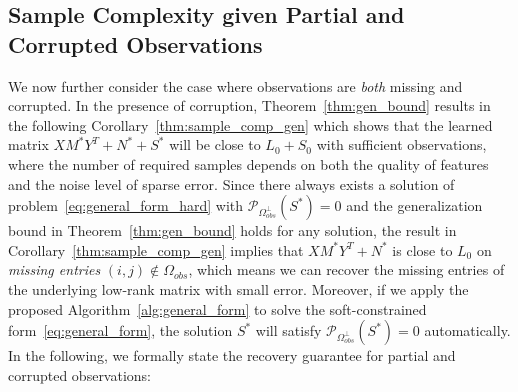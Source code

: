 \documentclass[twoside,11pt]{article}
\def\Obs{\Omega_{obs}}
\newcommand\proj[1]{{\mathcal P}_{#1}}
\def\realL{L_0}
\def\realS{S_0}
\def\optM{M^*}
\def\optN{N^*}
\def\optS{S^*}
\begin{document}
\subsection{Sample Complexity given Partial and Corrupted Observations}
\label{subsec:theory.gen}
We now further consider the case where observations are {\it both} missing and corrupted.
In the presence of corruption,
Theorem~\ref{thm:gen_bound} results in the following Corollary~\ref{thm:sample_comp_gen} which
shows that the learned matrix $X\optM Y^T + \optN + \optS$ will be close to $\realL + \realS$
with sufficient observations, where
the number of required samples depends on both the quality of features and the noise level of sparse error.
Since there always exists a solution of problem~\eqref{eq:general_form_hard}
with $\proj{\Obs^\perp}(\optS)=0$ and the generalization bound in Theorem~\ref{thm:gen_bound} holds for any solution,
the result in Corollary~\ref{thm:sample_comp_gen} implies that $X\optM Y^T + \optN$ is close to $\realL$
on {\it missing entries} $(i,j)\notin \Obs$, which means we can recover the missing entries
of the underlying low-rank matrix
with small error. Moreover, if we apply the proposed Algorithm~\ref{alg:general_form}  to solve
the soft-constrained form~\eqref{eq:general_form}, the solution $\optS$ will satisfy $\proj{\Obs^\perp}(\optS)=0$
automatically. In the following, we formally state the recovery guarantee for partial and corrupted observations:
\end{document}
